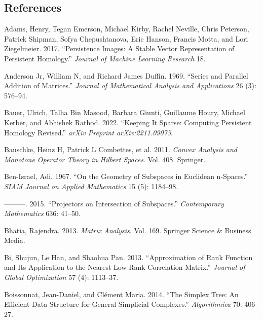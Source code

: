 \documentclass[
  letterpaper,
  DIV=11,
  numbers=noendperiod,
  oneside]{scrartcl}
\newlength{\cslhangindent}
\newlength{\cslentryspacingunit} %
\newenvironment{CSLReferences}[2] %
 {%
  \setlength{\parindent}{0pt}
  \ifodd #1
  \let\oldpar\par
  \def\par{\hangindent=\cslhangindent\oldpar}
  \fi
  \setlength{\parskip}{#2\cslentryspacingunit}
 }%
 {}
\begin{document}
\hypertarget{references}{%
\subsection{References}\label{references}}

\hypertarget{refs}{}
\begin{CSLReferences}{1}{0}
\leavevmode{}%
Adams, Henry, Tegan Emerson, Michael Kirby, Rachel Neville, Chris
Peterson, Patrick Shipman, Sofya Chepushtanova, Eric Hanson, Francis
Motta, and Lori Ziegelmeier. 2017. {``Persistence Images: A Stable
Vector Representation of Persistent Homology.''} \emph{Journal of
Machine Learning Research} 18.

\leavevmode{}%
Anderson Jr, William N, and Richard James Duffin. 1969. {``Series and
Parallel Addition of Matrices.''} \emph{Journal of Mathematical Analysis
and Applications} 26 (3): 576--94.

\leavevmode{}%
Bauer, Ulrich, Talha Bin Masood, Barbara Giunti, Guillaume Houry,
Michael Kerber, and Abhishek Rathod. 2022. {``Keeping It Sparse:
Computing Persistent Homology Revised.''} \emph{arXiv Preprint
arXiv:2211.09075}.

\leavevmode{}%
Bauschke, Heinz H, Patrick L Combettes, et al. 2011. \emph{Convex
Analysis and Monotone Operator Theory in Hilbert Spaces}. Vol. 408.
Springer.

\leavevmode{}%
Ben-Israel, Adi. 1967. {``On the Geometry of Subspaces in Euclidean
n-Spaces.''} \emph{SIAM Journal on Applied Mathematics} 15 (5):
1184--98.

\leavevmode{}%
---------. 2015. {``Projectors on Intersection of Subspaces.''}
\emph{Contemporary Mathematics} 636: 41--50.

\leavevmode{}%
Bhatia, Rajendra. 2013. \emph{Matrix Analysis}. Vol. 169. Springer
Science \& Business Media.

\leavevmode{}%
Bi, Shujun, Le Han, and Shaohua Pan. 2013. {``Approximation of Rank
Function and Its Application to the Nearest Low-Rank Correlation
Matrix.''} \emph{Journal of Global Optimization} 57 (4): 1113--37.

\leavevmode{}%
Boissonnat, Jean-Daniel, and Clément Maria. 2014. {``The Simplex Tree:
An Efficient Data Structure for General Simplicial Complexes.''}
\emph{Algorithmica} 70: 406--27.


\end{CSLReferences}
\end{document}
